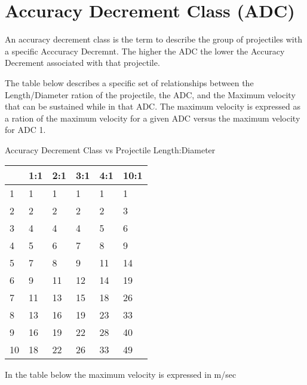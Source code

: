 \section{Accuracy Decrement Class (ADC)}

An accuracy decrement class is the term to describe the group of 
projectiles with a specific Acccuracy Decremnt. The higher the ADC the 
lower the Accuracy Decrement associated with that projectile. 

The table below describes a specific set of relationships between 
the Length/Diameter ration of the projectile, the ADC, and the 
Maximum velocity that can be sustained while in that ADC. The maximum 
velocity is expressed as a ration of the maximum velocity for a given 
ADC versus the maximum velocity for ADC 1. 


Accuracy Decrement Class vs Projectile Length:Diameter

\begin{tabular}{llllll} \hline 
     &  1:1   &   2:1  &    3:1   &   4:1  &   10:1  \\ \hline
1    &    1   &     1  &      1   &     1  &      1  \\
2    &    2   &     2  &      2   &     2  &      3  \\
3    &    4   &     4  &      4   &     5  &      6  \\
4    &    5   &     6  &      7   &     8  &      9  \\
5    &    7   &     8  &      9   &    11  &     14  \\
6    &    9   &    11  &     12   &    14  &     19  \\
7    &   11   &    13  &     15   &    18  &     26  \\
8    &   13   &    16  &     19   &    23  &     33  \\
9    &   16   &    19  &     22   &    28  &     40  \\
10   &   18   &    22  &     26   &    33  &     49  \\ \hline 
\end{tabular}
   
In the table below the maximum velocity is expressed in m/sec

